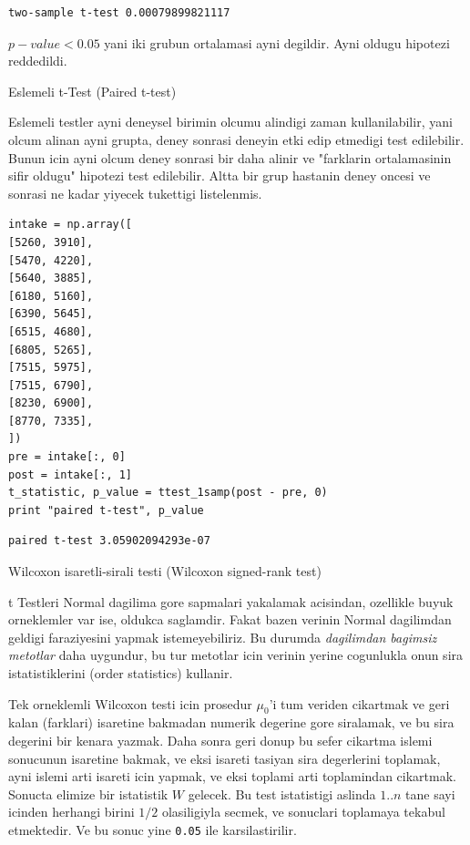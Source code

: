 \documentclass[12pt,fleqn]{article}\usepackage{../common}
\begin{document}
\begin{verbatim}
two-sample t-test 0.00079899821117
\end{verbatim}

$p-value < 0.05$ yani iki grubun ortalamasi ayni degildir. Ayni oldugu
hipotezi reddedildi.

Eslemeli t-Test (Paired t-test)

Eslemeli testler ayni deneysel birimin olcumu alindigi zaman
kullanilabilir, yani olcum alinan ayni grupta, deney sonrasi deneyin
etki edip etmedigi test edilebilir. Bunun icin ayni olcum deney
sonrasi bir daha alinir ve "farklarin ortalamasinin sifir oldugu"
hipotezi test edilebilir. Altta bir grup hastanin deney oncesi ve
sonrasi ne kadar yiyecek tukettigi listelenmis. 

\begin{verbatim}
intake = np.array([
[5260, 3910],
[5470, 4220],
[5640, 3885],
[6180, 5160],
[6390, 5645],
[6515, 4680],
[6805, 5265],
[7515, 5975],
[7515, 6790],
[8230, 6900],
[8770, 7335],
])
pre = intake[:, 0]
post = intake[:, 1]
t_statistic, p_value = ttest_1samp(post - pre, 0)
print "paired t-test", p_value
\end{verbatim}

\begin{verbatim}
paired t-test 3.05902094293e-07
\end{verbatim}

Wilcoxon isaretli-sirali testi (Wilcoxon signed-rank test)

t Testleri Normal dagilima gore sapmalari yakalamak acisindan,
ozellikle buyuk orneklemler var ise, oldukca saglamdir. Fakat bazen
verinin Normal dagilimdan geldigi faraziyesini yapmak istemeyebiliriz.
Bu durumda {\em dagilimdan bagimsiz metotlar} daha uygundur, bu tur
metotlar icin verinin yerine cogunlukla onun sira istatistiklerini
(order statistics) kullanir.

Tek orneklemli Wilcoxon testi icin prosedur $\mu_0$'i tum veriden
cikartmak ve geri kalan (farklari) isaretine bakmadan numerik degerine
gore siralamak, ve bu sira degerini bir kenara yazmak. Daha sonra geri
donup bu sefer cikartma islemi sonucunun isaretine bakmak, ve eksi
isareti tasiyan sira degerlerini toplamak, ayni islemi arti isareti
icin yapmak, ve eksi toplami arti toplamindan cikartmak. Sonucta
elimize bir istatistik $W$ gelecek. Bu test istatistigi aslinda $1..n$
tane sayi icinden herhangi birini $1/2$ olasiligiyla secmek, ve
sonuclari toplamaya tekabul etmektedir. Ve bu sonuc yine \verb!0.05!
ile karsilastirilir.
\end{document}
